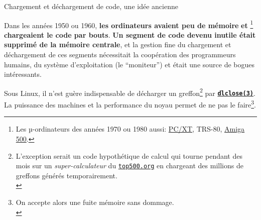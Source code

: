 \documentclass[final,a4,xcolor={svgnames,dvipsnames}]{beamer}
\begin{document}
 \begin{frame}{Chargement et déchargement de code, une idée ancienne}

   Dans les années 1950 ou 1960, \textbf{les ordinateurs avaient peu
     de mémoire} {} \textbf{et}
   {}\footnote{Les µ-ordinateurs des années
   1970 ou 1980 aussi:
   \href{https://fr.wikipedia.org/wiki/IBM_PC/XT}{PC/XT}, TRS-80,
   \href{https://fr.wikipedia.org/wiki/Amiga_500}{Amiga 500}.}
   \textbf{chargeaient le code par bouts}. \textbf{Un segment de code
     devenu inutile était supprimé de la mémoire centrale}, et la
   gestion fine du chargement et déchargement de ces segments
   nécessitait la coopération des programmeurs humains, du système
   d'exploitation (le ``moniteur'') et était une source de bogues
   intéressants.

   \bigskip

   Sous Linux, il n'est guère indispensable de décharger un
   greffon\footnote{L'exception serait un code hypothétique de calcul
   qui tourne pendant des mois sur un \textit{super-calculateur} du
   \href{https://top500.org/}{\texttt{top500.org}} en chargeant des
   millions de greffons générés temporairement.\\} par
   \textbf{\texttt{\href{https://man7.org/linux/man-pages/man3/dlclose.3.html}{dlclose(3)}}}. La
   puissance des machines et la performance du noyau
   {}
   permet de ne pas le faire\footnote{On accepte alors une fuite
   mémoire sans dommage.\\}.

 \end{frame}
\end{document}
